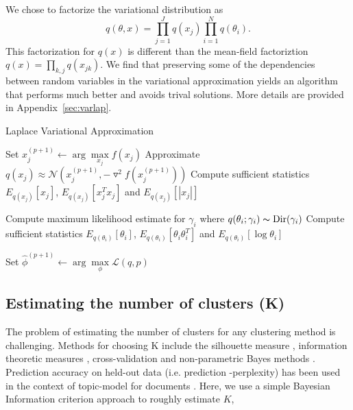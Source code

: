 \documentclass[11pt]{amsart}
\begin{document}
We chose to factorize the variational distribution as
\begin{equation}
	q(\theta,x) = \prod_{j=1}^J q(x_j) \prod_{i=1}^N q(\theta_i).
\end{equation}
This factorization for $q(x)$ is different than the mean-field factoriztion $q(x)=\prod_{k,j} q(x_{jk})$. We find that preserving some of the dependencies between random variables in the variational approximation yields an algorithm that performs much better and avoids trival solutions. More details are provided in Appendix~\ref{sec:varlap}.


\begin{algorithm}[ht]
\caption{Laplace Variational Approximation}
\label{alg:lapvar}
\begin{algorithmic}[1]

\REPEAT
{}
	\STATE Set $x_j^{(p+1)} \leftarrow \arg \max\limits_{x_j} f(x_j)$
	\STATE Approximate $q( x_j ) \approx \mathcal{N} \left( x_j^{(p+1)}, -\triangledown^2 f( x_j^{(p+1)} ) \right)$
	\STATE Compute sufficient statistics $E_{q(x_j)} \left[ x_j \right]$, $E_{q(x_j)} \left[ x_j^T x_j \right]$ and $E_{q(x_j)} \left[ | x_j | \right]$
\ENDFOR


	\STATE Compute maximum likelihood estimate for $\gamma_i$ where $q(\theta_i; \gamma_i) \thicksim \text{Dir} (\gamma_i)$
	\STATE Compute sufficient statistics $E_{q(\theta_i)} \left[ \theta_i \right]$, $E_{q(\theta_i)} \left[ \theta_i \theta_i^T \right]$ and $E_{q(\theta_i)} [ \log \theta_i ]$
\ENDFOR

\STATE Set $\hat{\phi}^{(p+1)} \leftarrow \arg \max\limits_{\phi} \mathcal{L}(q,p)$

\end{algorithmic}
\end{algorithm}

\subsection{Estimating the number of clusters (K)}

The problem of estimating the number of clusters for any clustering method is challenging. Methods for choosing K include the silhouette measure \cite{}, information theoretic measures \cite{}, cross-validation \cite{} and non-parametric Bayes methods \cite{}. Prediction accuracy on held-out data (i.e. prediction -perplexity) has been used in the context of topic-model for documents \cite{}. Here, we use a simple Bayesian Information criterion approach to roughly estimate $K$,
\end{document}
